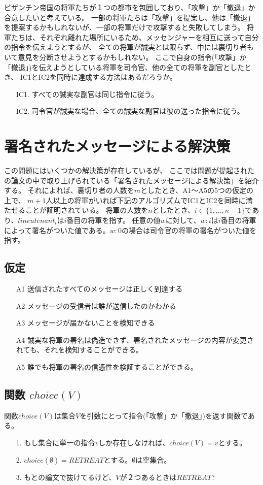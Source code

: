 ビザンチン帝国の将軍たちが１つの都市を包囲しており、「攻撃」か「撤退」か合意したいと考えている。
一部の将軍たちは「攻撃」を提案し、他は「撤退」を提案するかもしれないが、一部の将軍だけで攻撃すると失敗してしまう。
将軍たちは、それぞれ離れた場所にいるため、メッセンジャーを相互に送って自分の指令を伝えようとするが、
全ての将軍が誠実とは限らず、中には裏切り者もいて意見を分断させようとするかもしれない。
ここで自身の指令(「攻撃」か「撤退」)を伝えようとしている将軍を司令官、他の全ての将軍を副官としたとき、
IC1とIC2を同時に達成する方法はあるだろうか。

\begin{itemize}
  \item[IC1.] すべての誠実な副官は同じ指令に従う。
  \item[IC2.] 司令官が誠実な場合、全ての誠実な副官は彼の送った指令に従う。
\end{itemize}

\section{署名されたメッセージによる解決策}
この問題にはいくつかの解決策が存在しているが、
ここでは問題が提起されたの論文の中で取り上げられている「署名されたメッセージによる解決策」を紹介する。
それによれば、裏切り者の人数を$m$としたとき、A1〜A5の5つの仮定の上で、
$m+1$人以上の将軍がいれば下記のアルゴリズムでIC1とIC2を同時に満たせることが証明されている。
将軍の人数を$n$としたとき、$i \in \{1,...,n-1\}$であり、$lineutenant_i$は$i$番目の将軍を指す。
任意の値$w$に対して、$w:i$は$i$番目の将軍によって署名がついた値である。$w:0$の場合は司令官の将軍の署名がついた値を指す。

\subsection{仮定}
\begin{itemize}
  \item[A1] 送信されたすべてのメッセージは正しく到達する
  \item[A2] メッセージの受信者は誰が送信したのかわかる
  \item[A3] メッセージが届かないことを検知できる
  \item[A4] 誠実な将軍の署名は偽造できず、署名されたメッセージの内容が変更されても、それを検知することができる。
  \item[A5] 誰でも将軍の署名の信憑性を検証することができる。
\end{itemize}

\subsection{関数 $choice(V)$}
関数$choice(V)$は集合$V$を引数にとって指令(「攻撃」か「撤退」)を返す関数である。
\begin{enumerate}
  \item[1.] もし集合に単一の指令$v$しか存在しなければ、$choice(V) = v$とする。
  \item[2.] $choice(\emptyset) = RETREAT$とする。$\emptyset$は空集合。
  \item[3.] もとの論文で抜けてるけど、$V$が２つあるときは$RETREAT$?
\end{enumerate}

